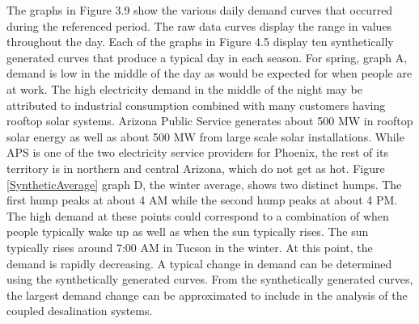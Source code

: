 The graphs in Figure 3.9 show the various daily demand curves that occurred during the referenced period. The raw data curves display the range in values throughout the day. Each of the graphs in Figure 4.5 display ten synthetically generated curves that produce a typical day in each season. For spring, graph A, demand is low in the middle of the day as would be expected for when people are at work. The high electricity demand in the middle of the night may be attributed to industrial consumption combined with many customers having rooftop solar systems.  Arizona Public Service generates about 500 MW in rooftop solar energy as well as about 500 MW from large scale solar installations. While APS is one of the two electricity service providers for Phoenix, the rest of its territory is in northern and central Arizona, which do not get as hot. Figure \ref{SyntheticAverage} graph D, the winter average, shows two distinct humps.  The first hump peaks at about 4 AM while the second hump peaks at about 4 PM. The high demand at these points could correspond to a combination of when people typically wake up as well as when the sun typically rises. The sun typically rises around 7:00 AM in Tucson in the winter.  At this point, the demand is rapidly decreasing.  A typical change in demand can be determined using the synthetically generated curves. From the synthetically generated curves, the largest demand change can be approximated to include in the analysis of the coupled desalination systems.


